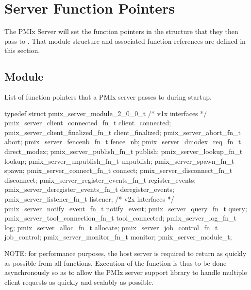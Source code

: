 \section{Server Function Pointers}

The PMIx Server will set the function pointers in the  structure that they then pass to .
That module structure and associated function references are defined in this section.

\subsection{ Module}

\summary

List of function pointers that a PMIx server passes to  during startup.

\format

\cspecificstart
\begin{codepar}
typedef struct pmix_server_module_2_0_0_t {
    /* v1x interfaces */
    pmix_server_client_connected_fn_t   client_connected;
    pmix_server_client_finalized_fn_t   client_finalized;
    pmix_server_abort_fn_t              abort;
    pmix_server_fencenb_fn_t            fence_nb;
    pmix_server_dmodex_req_fn_t         direct_modex;
    pmix_server_publish_fn_t            publish;
    pmix_server_lookup_fn_t             lookup;
    pmix_server_unpublish_fn_t          unpublish;
    pmix_server_spawn_fn_t              spawn;
    pmix_server_connect_fn_t            connect;
    pmix_server_disconnect_fn_t         disconnect;
    pmix_server_register_events_fn_t    register_events;
    pmix_server_deregister_events_fn_t  deregister_events;
    pmix_server_listener_fn_t           listener;
    /* v2x interfaces */
    pmix_server_notify_event_fn_t       notify_event;
    pmix_server_query_fn_t              query;
    pmix_server_tool_connection_fn_t    tool_connected;
    pmix_server_log_fn_t                log;
    pmix_server_alloc_fn_t              allocate;
    pmix_server_job_control_fn_t        job_control;
    pmix_server_monitor_fn_t            monitor;
} pmix_server_module_t;
\end{codepar}
\cspecificend

\descr

NOTE: for performance purposes, the host server is required to return as quickly as possible from all functions.
Execution of the function is thus to be done asynchronously so as to allow the PMIx server support library to handle multiple client requests as quickly and scalably as possible.

